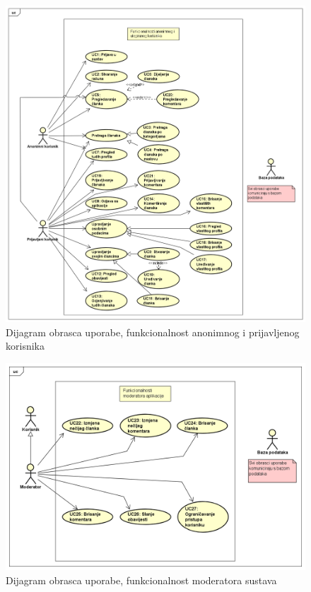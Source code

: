 \begin{figure}[H]
	\includegraphics[scale=0.4]{slike/DijagramObrazacaUporabe1.PNG}
	\centering
	\caption{Dijagram obrasca uporabe, funkcionalnost anonimnog i prijavljenog korisnika}
	\label{fig:obrazac_uporabe1}
\end{figure}

\eject		

\begin{figure}[H]
	\includegraphics[scale=0.4]{slike/DijagramObrazacaUporabe2.PNG}
	\centering
	\caption{Dijagram obrasca uporabe, funkcionalnost moderatora sustava}
	\label{fig:obrazac_uporabe2}
\end{figure}

